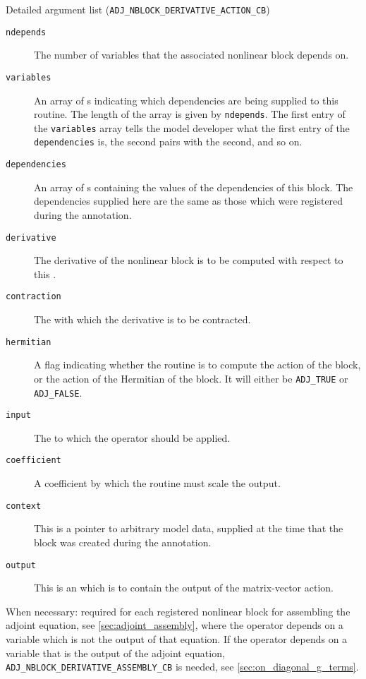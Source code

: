 \begin{boxwithtitle}{Detailed argument list (\texttt{ADJ_NBLOCK_DERIVATIVE_ACTION_CB})}
\begin{description}
\item[\texttt{ndepends}] The number of variables that the associated nonlinear block depends on.
\item[\texttt{variables}] An array of s indicating which dependencies are being supplied to this routine. The length of the
array is given by \texttt{ndepends}. The first entry of the \texttt{variables} array
tells the model developer what the first entry of the \texttt{dependencies} is, the second pairs with the second, and so on.
\item[\texttt{dependencies}] An array of s containing the values of the dependencies of this block. The dependencies supplied
here are the same as those which were registered during the annotation.
\item[\texttt{derivative}] The derivative of the nonlinear block is to be computed with respect to this . 
\item[\texttt{contraction}] The  with which the derivative is to be contracted.  
\item[\texttt{hermitian}] A flag indicating whether the routine is to compute the action of the block, or the action of the Hermitian of the
block. It will either be \texttt{ADJ_TRUE} or \texttt{ADJ_FALSE}.
\item[\texttt{input}] The  to which the operator should be applied.
\item[\texttt{coefficient}] A coefficient by which the routine must scale the output.
\item[\texttt{context}] This is a pointer to arbitrary model data, supplied at the time that the block was created during the annotation.
\item[\texttt{output}] This is an  which is to contain the output of the matrix-vector action.
\end{description}
\end{boxwithtitle}

When necessary: required for each registered nonlinear block for assembling the adjoint equation, see \autoref{sec:adjoint_assembly}, where the operator depends on a variable which is not the output of that equation. 
If the operator depends on a variable that is the output of the adjoint equation, \texttt{ADJ_NBLOCK_DERIVATIVE_ASSEMBLY_CB} is needed, see \autoref{sec:on_diagonal_g_terms}.

